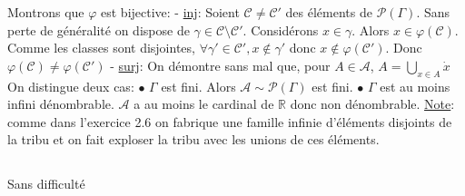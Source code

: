 \documentclass{report}
\begin{document}
Montrons que $\varphi$ est bijective: \newline
- \underline {inj}: Soient $\mathcal C \neq \mathcal C'$ des éléments de $\mathcal P(\Gamma)$. Sans perte de généralité on dispose de $\gamma \in \mathcal C \setminus \mathcal C'$. Considérons $x\in \gamma$. Alors $x\in \varphi(\mathcal C)$. Comme les classes sont disjointes, $\forall \gamma' \in \mathcal C', x\notin \gamma'$ donc $x\notin \varphi(\mathcal C')$. Donc $\varphi(\mathcal C) \neq \varphi(\mathcal C')$ \newline
- \underline {surj}: On démontre sans mal que, pour $A\in \mathcal A$, $\displaystyle A=\bigcup_{x\in A} \dot x$ \newline
On distingue deux cas: \newline
$\bullet$ $\Gamma$ est fini. Alors $\mathcal A\sim \mathcal{P}(\Gamma)$ est fini.\newline
$\bullet$ $\Gamma$ est au moins infini dénombrable. $\mathcal A$ a au moins le cardinal de $\mathbb R$ donc non dénombrable. \newline
\underline{Note}: comme dans l'exercice 2.6 on fabrique une famille infinie d'éléments disjoints de la tribu et on fait exploser la tribu avec les unions de ces éléments.

\subsection{} Sans difficulté

\subsection{} \\
\end{document}
